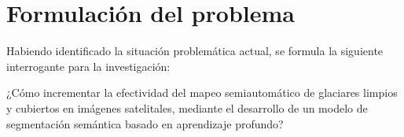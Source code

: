 \section{Formulación del problema}
\label{sec:FormulacionProblema}

Habiendo identificado la situación problemática actual, se formula la siguiente interrogante para la investigación:

¿Cómo incrementar la efectividad del mapeo semiautomático de glaciares limpios y cubiertos en imágenes satelitales, mediante el desarrollo de un modelo de segmentación semántica basado en aprendizaje profundo?